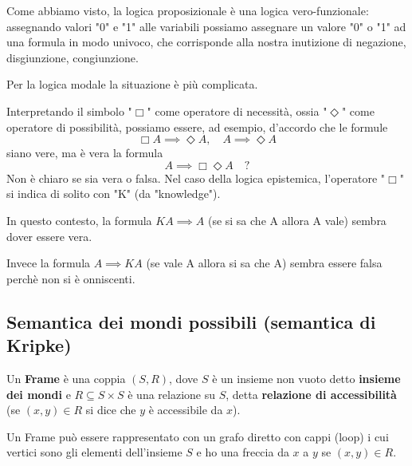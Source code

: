 \documentclass[10pt,a4paper,twoside]{book}
\begin{document}
Come abbiamo visto, la logica proposizionale è una logica vero-funzionale: assegnando valori "0" e "1" alle variabili possiamo assegnare un valore "0" o "1" ad una formula in modo univoco, che corrisponde alla nostra inutizione di negazione, disgiunzione, congiunzione.

Per la logica modale la situazione è più complicata.

Interpretando il simbolo "$\Box$" come operatore di necessità, ossia "$\Diamond$" come operatore di possibilità, possiamo essere, ad esempio, d'accordo che le formule
\begin{equation*}
    \Box A \implies \Diamond A, \quad A \implies \Diamond A
\end{equation*}
siano vere, ma è vera la formula
\begin{equation*}
    A \implies \Box \Diamond A \quad \text{?}
\end{equation*}
Non è chiaro se sia vera o falsa. Nel caso della logica epistemica, l'operatore "$\Box$" si indica di solito con "K" (da "knowledge").

In questo contesto, la formula $KA \implies A$ (se si sa che A allora A vale) sembra dover essere vera.

Invece la formula $A \implies KA$ (se vale A allora si sa che A) sembra essere falsa perchè non si è onniscenti.

\subsection{Semantica dei mondi possibili (semantica di Kripke)}
\begin{definition}[Frame]
    Un \textbf{Frame} è una coppia $(S,R)$, dove $S$ è un insieme non vuoto detto \textbf{insieme dei mondi} e $R \subseteq S \times S$ è una relazione su $S$, detta \textbf{relazione di accessibilità} (se $(x,y) \in R$ si dice che $y$ è accessibile da $x$).
\end{definition}
Un Frame può essere rappresentato con un grafo diretto con cappi (loop) i cui vertici sono gli elementi dell'insieme $S$ e ho una freccia da $x$ a $y$ se $(x,y) \in R$.
\end{document}
